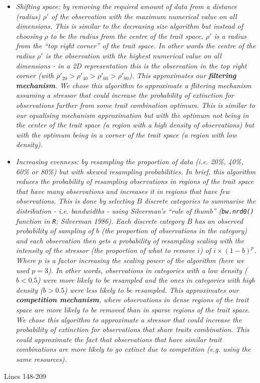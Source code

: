 \documentclass[
]{article}
\begin{document}
\begin{itemize}
\item \textit{Shifting space: by removing the required amount of data from a distance (radius) $\rho'$ of the observation with the maximum numerical value on all dimensions.
This is similar to the decreasing size algorithm but instead of choosing $\rho$ to be the radius from the centre of the trait space, $\rho'$ is a radius from the ``top right corner'' of the trait space.
In other words the centre of the radius $\rho'$ is the observation with the highest numerical value on all dimensions - in a 2D representation this is the observation in the top right corner (with $\rho'_{20} > \rho'_{40} > \rho'_{60} > \rho'_{80}$).
This approximates our \textbf{filtering mechanism}.
We chose this algorithm to approximate a flitering mechanism assuming a stressor that could increase the probability of extinction for observations further from some trait combination optimum.
This is similar to our equalising mechanism approximation but with the optimum not being in the center of the trait space (a region with a high density of observations) but with the optimum being in a corner of the trait space (a region with low density).}

\item \textit{Increasing evenness: by resampling the proportion of data (i.e. 20\%, 40\%, 60\% or 80\%) but with skewed resampling probabilities.
In brief, this algorithm reduces the probability of resampling observations in regions of the trait space that have many observations and increases it in regions that have few observations.
This is done by selecting $B$ discrete categories to summarise the distribution - i.e. bandwidths - using Silverman's ``rule of thumb'' (\texttt{bw.nrd0()} function in \texttt{R}; Silverman 1986).
Each discrete category $B$ has an observed probability of sampling of $b$ (the proportion of observations in the category) and each observation then gets a probability of resampling scaling with the intensity of the stressor (the proportion of what to remove $i$) of $i \times (1-b)^{p}$. 
Where $p$ is a factor increasing the scaling power of the algorithm (here we used $p=3$).
In other words, observations in categories with a low density ($b<0.5$) were more likely to be resampled and the ones in categories with high density ($b>0.5$) were less likely to be resampled.
This approximates our \textbf{competition mechanism}, where observations in dense regions of the trait space are more likely to be removed than in sparse regions of the trait space.
We chose this algorithm to approximate a stressor that could increase the probability of extinction for observations that share traits combination.
This could approximate the fact that observations that have similar trait combinations are more likely to go extinct due to competition (e.g. using the same resources).}
\end{itemize}
Lines 148-209
\end{document}
